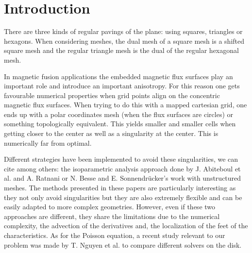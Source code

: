 \documentclass[proc]{edpsmath}
\begin{document}
\maketitle


\section*{Introduction}


There are three kinds of regular pavings of the plane: using squares, triangles or hexagons. When considering meshes, the dual mesh of a square mesh is a shifted square mesh and the regular triangle mesh is the dual of the regular hexagonal mesh.

In magnetic fusion applications the embedded magnetic flux surfaces play an important role and introduce an important anisotropy\cite{Angelino2009}. For this reason one gets favourable numerical properties when grid points align on the concentric magnetic flux surfaces. When trying to do this with a mapped cartesian grid, one ends up with a polar coordinates mesh (when the flux surfaces are circles) or something topologically equivalent. This yields smaller and smaller cells when getting closer to the center as well as a singularity at the center. This is numerically far from optimal. 

Different strategies have been implemented to avoid these singularities, we can cite among others: the isoparametric analysis approach done by J. Abiteboul et al. \cite{abiteboul2011solving} and A. Ratnani \cite{ratnani2011isogeometric} or N. Besse and E. Sonnendr\"{u}cker's work with unstructured meshes\cite{Besse2003341}. The methods presented in these papers are particularly interesting as  they not only avoid singularities but they are also extremely flexible and can be easily adapted to more complex geometries. However, even if these two approaches are different, they share the limitations due to the numerical complexity, the advection of the derivatives and, the localization of the feet of the characteristics. 
As for the Poisson equation, a recent study relevant to our problem was made by T. Nguyen et al.\cite{axioms3020280} to compare different solvers on the disk. 
\end{document}
